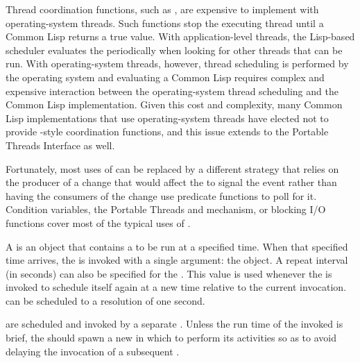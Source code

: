 Thread coordination functions, such as , are
expensive to implement with operating-system threads.  Such functions stop the
executing thread until a Common Lisp  returns a true
value.  With application-level threads, the Lisp-based scheduler evaluates the
 periodically when looking for other threads that
can be run.  With operating-system threads, however, thread scheduling is
performed by the operating system and evaluating a Common Lisp
 requires complex and expensive interaction between
the operating-system thread scheduling and the Common Lisp implementation.
Given this cost and complexity, many Common Lisp implementations that use
operating-system threads have elected not to provide
-style coordination functions, and this issue
extends to the Portable Threads Interface as well.

Fortunately, most uses of  can be replaced by a
different strategy that relies on the producer of a change that would affect
the   to signal the event
rather than having the consumers of the change use predicate functions to poll
for it.  Condition variables, the Portable Threads
 and
 mechanism, or blocking I/O functions
cover most of the typical uses of .


A  is an object that contains a  to
be run at a specified time. When that specified time arrives, the
 is invoked with a single argument: the
 object. A repeat interval (in seconds) can also be
specified for the . This value is used whenever the
 is invoked to schedule itself again at a new time
relative to the current invocation.   can be
scheduled to a resolution of one second.

 are scheduled and invoked by a separate
 .  Unless the run
time of the invoked  is brief, the  should
spawn a new  in which to perform its activities so as to avoid
delaying the invocation of a subsequent .


